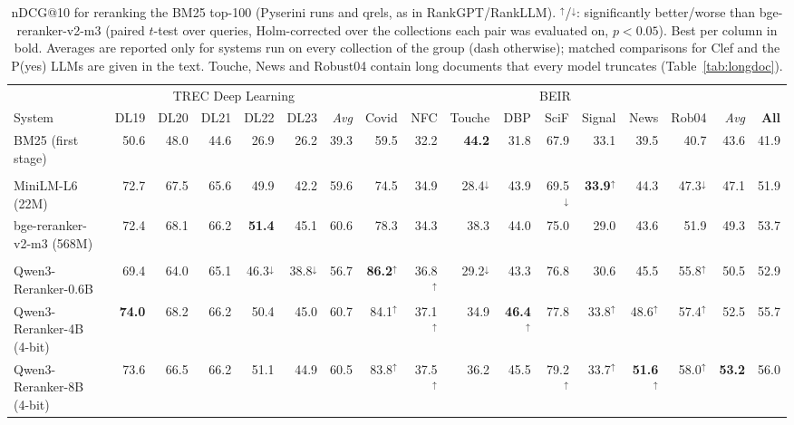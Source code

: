 \begin{table}[t]
\centering
\footnotesize
\setlength{\tabcolsep}{2.6pt}
\caption{nDCG@10 for reranking the BM25 top-100 (Pyserini runs and qrels, as in RankGPT/RankLLM). $^\uparrow$/$^\downarrow$: significantly better/worse than bge-reranker-v2-m3 (paired $t$-test over queries, Holm-corrected over the collections each pair was evaluated on, $p<0.05$). Best per column in bold. Averages are reported only for systems run on every collection of the group (dash otherwise); matched comparisons for Clef and the P(yes) LLMs are given in the text. Touche, News and Robust04 contain long documents that every model truncates (Table~\ref{tab:longdoc}).}
\label{tab:ranking-full}
\begin{tabular}{lrrrrr|r|rrrrrrrr|r|r}
\toprule
 & \multicolumn{6}{c|}{TREC Deep Learning} & \multicolumn{9}{c|}{BEIR} & \\
System & DL19 & DL20 & DL21 & DL22 & DL23 & \textit{Avg} & Covid & NFC & Touche & DBP & SciF & Signal & News & Rob04 & \textit{Avg} & \textbf{All} \\
\midrule
BM25 (first stage) & 50.6 & 48.0 & 44.6 & 26.9 & 26.2 & 39.3 & 59.5 & 32.2 & \textbf{44.2} & 31.8 & 67.9 & 33.1 & 39.5 & 40.7 & 43.6 & 41.9 \\
\addlinespace[1pt]
\multicolumn{17}{l}{\textit{Cross-encoders}} \\
MiniLM-L6 (22M) & 72.7 & 67.5 & 65.6 & 49.9 & 42.2 & 59.6 & 74.5 & 34.9 & 28.4$^\downarrow$ & 43.9 & 69.5$^\downarrow$ & \textbf{33.9}$^\uparrow$ & 44.3 & 47.3$^\downarrow$ & 47.1 & 51.9 \\
bge-reranker-v2-m3 (568M) & 72.4 & 68.1 & 66.2 & \textbf{51.4} & 45.1 & 60.6 & 78.3 & 34.3 & 38.3 & 44.0 & 75.0 & 29.0 & 43.6 & 51.9 & 49.3 & 53.7 \\
\addlinespace[1pt]
\multicolumn{17}{l}{\textit{Label-probability LLM rerankers}} \\
Qwen3-Reranker-0.6B & 69.4 & 64.0 & 65.1 & 46.3$^\downarrow$ & 38.8$^\downarrow$ & 56.7 & \textbf{86.2}$^\uparrow$ & 36.8$^\uparrow$ & 29.2$^\downarrow$ & 43.3 & 76.8 & 30.6 & 45.5 & 55.8$^\uparrow$ & 50.5 & 52.9 \\
Qwen3-Reranker-4B (4-bit) & \textbf{74.0} & 68.2 & 66.2 & 50.4 & 45.0 & 60.7 & 84.1$^\uparrow$ & 37.1$^\uparrow$ & 34.9 & \textbf{46.4}$^\uparrow$ & 77.8 & 33.8$^\uparrow$ & 48.6$^\uparrow$ & 57.4$^\uparrow$ & 52.5 & 55.7 \\
Qwen3-Reranker-8B (4-bit) & 73.6 & 66.5 & 66.2 & 51.1 & 44.9 & 60.5 & 83.8$^\uparrow$ & 37.5$^\uparrow$ & 36.2 & 45.5 & 79.2$^\uparrow$ & 33.7$^\uparrow$ & \textbf{51.6}$^\uparrow$ & 58.0$^\uparrow$ & \textbf{53.2} & 56.0 \\

\end{tabular}
\end{table}
